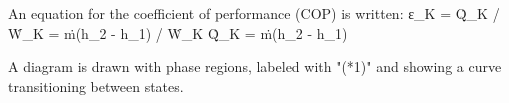 An equation for the coefficient of performance (COP) is written:  
ε_K = Q̇_K / Ẇ_K = ṁ(h_2 - h_1) / Ẇ_K  
Q̇_K = ṁ(h_2 - h_1)  

A diagram is drawn with phase regions, labeled with "(*1)" and showing a curve transitioning between states.